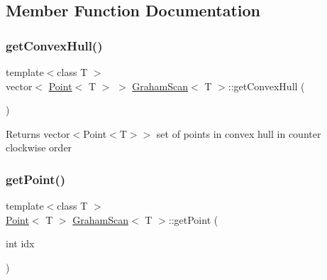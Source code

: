 \subsection{Member Function Documentation}
\mbox{\label{classGrahamScan_a0731f364efdbbb6028a38c623e99766d}} 
\subsubsection{\texorpdfstring{get\+Convex\+Hull()}{getConvexHull()}}
{\footnotesize\ttfamily template$<$class T $>$ \\
vector$<$ \mbox{\hyperlink{classPoint}{Point}}$<$ T $>$ $>$ \mbox{\hyperlink{classGrahamScan}{Graham\+Scan}}$<$ T $>$\+::get\+Convex\+Hull (\begin{DoxyParamCaption}{ }\end{DoxyParamCaption})}

\begin{DoxyReturn}{Returns}
vector$<$Point$<$\+T$>$$>$ set of points in convex hull in counter clockwise order 
\end{DoxyReturn}

\begin{DoxyCode}{0}

\end{DoxyCode}
\mbox{\label{classGrahamScan_ae6eec90fe568ee1b61ec1d8bba4c309e}} 
\subsubsection{\texorpdfstring{get\+Point()}{getPoint()}}
{\footnotesize\ttfamily template$<$class T $>$ \\
\mbox{\hyperlink{classPoint}{Point}}$<$ T $>$ \mbox{\hyperlink{classGrahamScan}{Graham\+Scan}}$<$ T $>$\+::get\+Point (\begin{DoxyParamCaption}\item[{int}]{idx }\end{DoxyParamCaption})\hspace{0.3cm}{\ttfamily [private]}}



